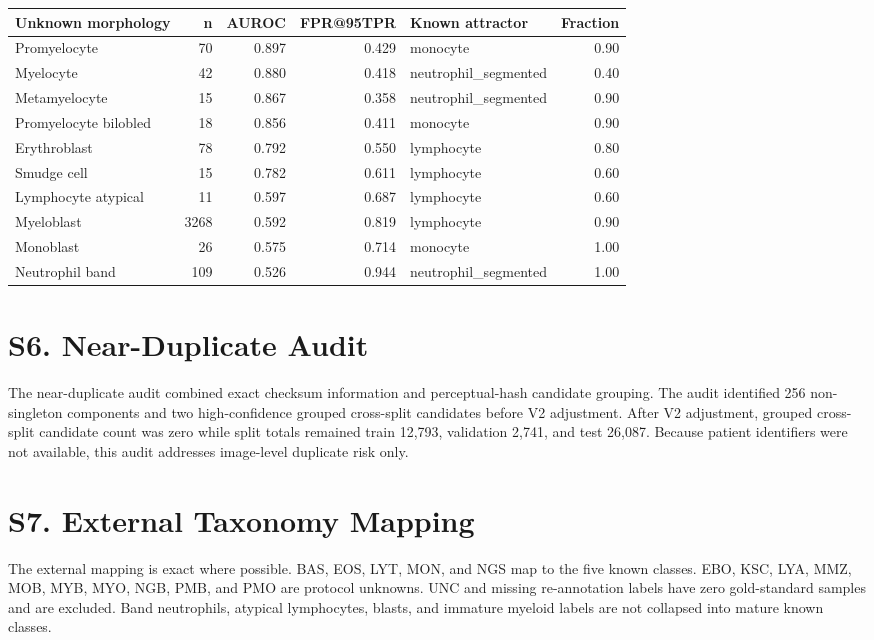 \documentclass[11pt]{article}
\begin{document}
{\small
\begin{longtable}{p{} r r r p{} r}
\toprule
Unknown morphology & n & AUROC & FPR@95TPR & Known attractor & Fraction \\
\midrule
Promyelocyte & 70 & 0.897 & 0.429 & monocyte & 0.90 \\
Myelocyte & 42 & 0.880 & 0.418 & neutrophil\_segmented & 0.40 \\
Metamyelocyte & 15 & 0.867 & 0.358 & neutrophil\_segmented & 0.90 \\
Promyelocyte bilobled & 18 & 0.856 & 0.411 & monocyte & 0.90 \\
Erythroblast & 78 & 0.792 & 0.550 & lymphocyte & 0.80 \\
Smudge cell & 15 & 0.782 & 0.611 & lymphocyte & 0.60 \\
Lymphocyte atypical & 11 & 0.597 & 0.687 & lymphocyte & 0.60 \\
Myeloblast & 3268 & 0.592 & 0.819 & lymphocyte & 0.90 \\
Monoblast & 26 & 0.575 & 0.714 & monocyte & 1.00 \\
Neutrophil band & 109 & 0.526 & 0.944 & neutrophil\_segmented & 1.00 \\
\bottomrule
\end{longtable}
}

\section*{S6. Near-Duplicate Audit}

The near-duplicate audit combined exact checksum information and perceptual-hash candidate grouping. The audit identified 256 non-singleton components and two high-confidence grouped cross-split candidates before V2 adjustment. After V2 adjustment, grouped cross-split candidate count was zero while split totals remained train 12,793, validation 2,741, and test 26,087. Because patient identifiers were not available, this audit addresses image-level duplicate risk only.

\section*{S7. External Taxonomy Mapping}

The external mapping is exact where possible. BAS, EOS, LYT, MON, and NGS map to the five known classes. EBO, KSC, LYA, MMZ, MOB, MYB, MYO, NGB, PMB, and PMO are protocol unknowns. UNC and missing re-annotation labels have zero gold-standard samples and are excluded. Band neutrophils, atypical lymphocytes, blasts, and immature myeloid labels are not collapsed into mature known classes.
\end{document}
